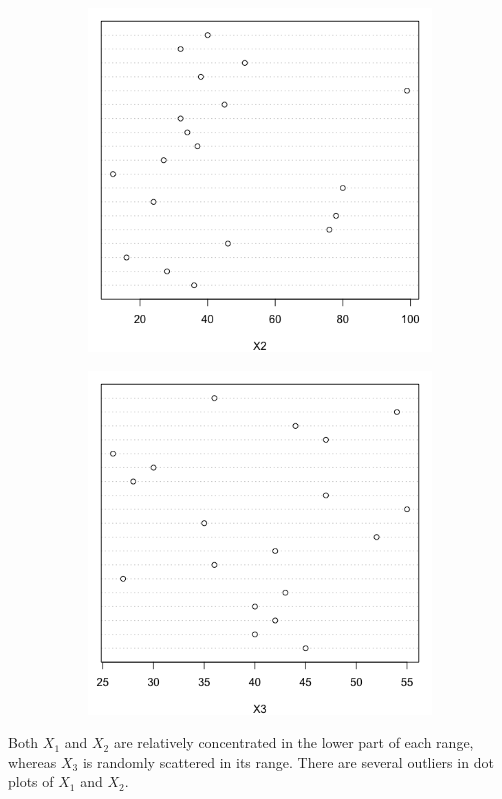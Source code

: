 \documentclass[10pt]{report}
\begin{document}
\begin{enumerate}[a.]
\begin{figure}[H]
\begin{subfigure}[b]{.3\linewidth}
			\includegraphics[width=\linewidth]{p1/13a_x2.png} 
		\end{subfigure}
		\begin{subfigure}[b]{.3\linewidth}
			\includegraphics[width=\linewidth]{p1/13a_x3.png} 
		\end{subfigure}
	\end{figure}
	Both $X_1$ and $X_2$ are relatively concentrated in the lower part of each range, whereas $X_3$ is randomly scattered in its range. There are several outliers in dot plots of $X_1$ and $X_2$.
	

\end{enumerate}
\end{document}
